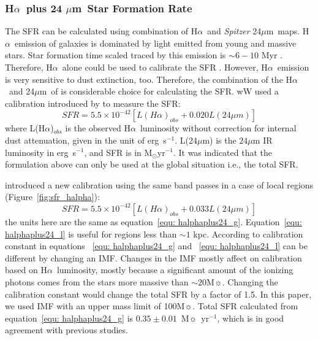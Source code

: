 \documentclass[useAMS,usenatbib]{mn2e}
\newcommand \halpha    {H$\alpha $\ }
\newcommand \um    {$\mu$m\ }
\newcommand \Spitzer {{\it Spitzer }}
\begin{document}
\subsubsection{\halpha plus 24 \um Star Formation Rate}
\label{sec:sfr_halpha}

The SFR can be calculated using combination of \halpha and \Spitzer  24\um maps. \halpha emission of galaxies is dominated by light emitted from young and massive stars. Star formation time scaled traced by this emission is $\sim 6-10$ Myr \citep[e.g.,][]{Kennicutt09, Calzetti13}. Therefore, \halpha alone could be used to calibrate the SFR \citep[e.g.,][]{Osterbrock06, Kennicutt09}. However, \halpha emission is very sensitive to dust extinction, too. Therefore, the combination of the \halpha and 24\um of is considerable choice for calculating the SFR. wW used a calibration introduced by \cite{Kennicutt09} to measure the SFR:
\begin{equation}
\label{equ: halphaplus24_g}
SFR = 5.5 \times 10^{-42}[L(H{\alpha})_{obs} + 0.020L(24\mu m)]
\end{equation}
where L(H${\alpha}$)$_{obs}$ is the observed \halpha luminosity without correction for internal dust attenuation, given in the unit of erg~s$^{-1}$. L(24$\mu$m) is the $24\mu$m IR luminosity in erg~s$^{-1}$, and SFR is in M$_{\odot}$yr$^{-1}$. It was indicated that the formulation above can only be used at the global situation i.e., the total SFR.

\cite{Calzetti07} introduced a new calibration using the same band passes in a case of local regions (Figure~\ref{fig:sfr_halpha}):
\begin{equation}
\label{equ: halphaplus24_l}
SFR = 5.5 \times 10^{-42}[L(H{\alpha})_{obs} + 0.033L(24\mu m)]
\end{equation}
the units here are the same as equation~\ref{equ: halphaplus24_g}. Equation~\ref{equ: halphaplus24_l} is useful for regions less than $\sim 1$ kpc. According to  \cite{Calzetti07} calibration constant in equations ~\ref{equ: halphaplus24_g} and ~\ref{equ: halphaplus24_l} can be different by changing an IMF. Changes in the IMF mostly affect on calibration based on \halpha luminosity, mostly because a significant amount of the ionizing photons comes from the stars more massive than $\sim 20$M$\sun$. Changing the calibration constant would change the total SFR by a factor of 1.5. In this paper, we used \cite{Kroupa01} IMF with an upper mass limit of 100M$\sun$. Total SFR calculated from equation~\ref{equ: halphaplus24_g} is $0.35 \pm 0.01$~M$\sun$~yr$^{-1}$, which is in good agreement with previous studies.
\end{document}

